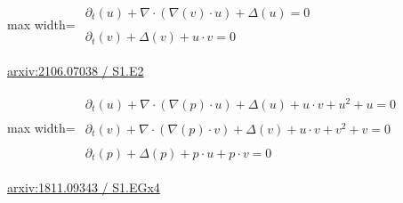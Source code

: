 \documentclass[10pt,a4paper]{article}
\begin{document}
\begin{minipage}{\linewidth}
\begin{center}\begin{adjustbox}{max width=\linewidth}$\displaystyle\begin{gathered}\begin{gathered}\partial_{t}(u)+\nabla\cdot(\nabla(v)\cdot u)+\Delta(u)=0\end{gathered}\\[5pt]\begin{gathered}\partial_{t}(v)+\Delta(v)+u\cdot v=0\end{gathered}\end{gathered}$\end{adjustbox}\end{center}
{\small \href{https://arxiv.org/html/2106.07038#S1.E2}{arxiv:2106.07038 / S1.E2}}\par
\end{minipage}\par\vspace{7mm}

\begin{minipage}{\linewidth}
\begin{center}\begin{adjustbox}{max width=\linewidth}$\displaystyle\begin{gathered}\begin{gathered}\partial_{t}(u)+\nabla\cdot(\nabla(p)\cdot u)+\Delta(u)+u\cdot v+u^{2}+u=0\end{gathered}\\[5pt]\begin{gathered}\partial_{t}(v)+\nabla\cdot(\nabla(p)\cdot v)+\Delta(v)+u\cdot v+v^{2}+v=0\end{gathered}\\[5pt]\begin{gathered}\partial_{t}(p)+\Delta(p)+p\cdot u+p\cdot v=0\end{gathered}\end{gathered}$\end{adjustbox}\end{center}
{\small \href{https://arxiv.org/html/1811.09343#S1.EGx4}{arxiv:1811.09343 / S1.EGx4}}\par
\end{minipage}\par\vspace{7mm}
\end{document}

